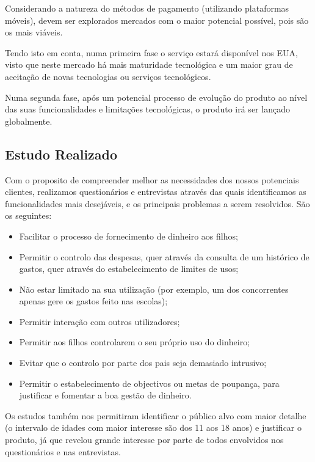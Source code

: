 \documentclass[12pt,a4paper]{article}
\begin{document}
Considerando a natureza do métodos de pagamento (utilizando plataformas móveis), devem ser explorados mercados com o maior potencial possível, pois são os mais viáveis.

Tendo isto em conta, numa primeira fase o serviço estará disponível nos EUA, visto que neste mercado há mais maturidade tecnológica e um maior grau de aceitação de novas tecnologias ou serviços tecnológicos.

Numa segunda fase, após um potencial processo de evolução do produto ao nível das suas funcionalidades e limitações tecnológicas, o produto irá ser lançado globalmente.

\subsection{Estudo Realizado}
\label{subsec:estudo_realizado}

Com o proposito de compreender melhor as necessidades dos nossos potenciais clientes, realizamos questionários e entrevistas através das quais identificamos as funcionalidades mais desejáveis, e os principais problemas a serem resolvidos. São os seguintes:

\begin{itemize}
\item Facilitar o processo de fornecimento de dinheiro aos filhos;
\item Permitir o controlo das despesas, quer através da consulta de um histórico de gastos, quer através do estabelecimento de limites de usos;
\item Não estar limitado na sua utilização (por exemplo, um dos concorrentes apenas gere os gastos feito nas escolas);
\item Permitir interação com outros utilizadores;
\item Permitir aos filhos controlarem o seu próprio uso do dinheiro;
\item Evitar que o controlo por parte dos pais seja demasiado intrusivo;
\item Permitir o estabelecimento de objectivos ou metas de poupança, para justificar e fomentar a boa gestão de dinheiro.
\end{itemize}

Os estudos também nos permitiram identificar o público alvo com maior detalhe (o intervalo de idades com maior interesse são dos 11 aos 18 anos) e justificar o produto, já que revelou grande interesse por parte de todos envolvidos nos questionários e nas entrevistas.
\end{document}
